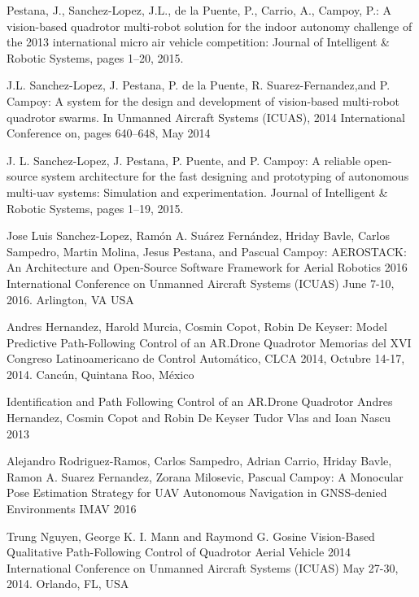 \documentclass{styles/svproc}
\begin{document}
\begin{thebibliography}{6}
  Pestana, J., Sanchez-Lopez, J.L., de la Puente, P., Carrio, A., Campoy, P.:
  A vision-based quadrotor multi-robot solution for the indoor autonomy challenge of the 2013 international micro air vehicle competition:
  Journal of Intelligent \& Robotic Systems, pages 1–20, 2015.
  
  J.L. Sanchez-Lopez, J. Pestana, P. de la Puente, R. Suarez-Fernandez,and P. Campoy:
  A system for the design and development of vision-based multi-robot quadrotor swarms.
  In Unmanned Aircraft Systems (ICUAS), 2014 International Conference on, pages 640–648, May 2014
  
  J. L. Sanchez-Lopez, J. Pestana, P. Puente, and P. Campoy:
  A reliable open-source system architecture for the fast designing and prototyping of autonomous multi-uav systems: Simulation and experimentation.
  Journal of Intelligent \& Robotic Systems, pages 1–19, 2015.

  Jose Luis Sanchez-Lopez, Ramón A. Suárez Fernández, Hriday Bavle, Carlos Sampedro, Martin Molina, Jesus Pestana, and Pascual Campoy:
  AEROSTACK: An Architecture and Open-Source Software Framework for Aerial Robotics
  2016 International Conference on Unmanned Aircraft Systems (ICUAS) June 7-10, 2016. Arlington, VA USA

  Andres Hernandez, Harold Murcia, Cosmin Copot, Robin De Keyser:
  Model Predictive Path-Following Control of an AR.Drone Quadrotor 
  Memorias del XVI Congreso Latinoamericano de Control Automático, CLCA 2014, Octubre 14-17, 2014. Cancún, Quintana Roo, México

  Identification and Path Following Control of an AR.Drone Quadrotor
  Andres Hernandez, Cosmin Copot and Robin De Keyser Tudor Vlas and Ioan Nascu
  2013

  Alejandro Rodriguez-Ramos, Carlos Sampedro, Adrian Carrio, Hriday Bavle, Ramon A. Suarez Fernandez, Zorana Milosevic, Pascual Campoy:  
  A Monocular Pose Estimation Strategy for UAV Autonomous Navigation in GNSS-denied Environments
  IMAV 2016
  
  Trung Nguyen, George K. I. Mann and Raymond G. Gosine
  Vision-Based Qualitative Path-Following Control of Quadrotor Aerial Vehicle
  2014 International Conference on Unmanned Aircraft Systems (ICUAS) May 27-30, 2014. Orlando, FL, USA



\end{thebibliography}

        
\end{document}
